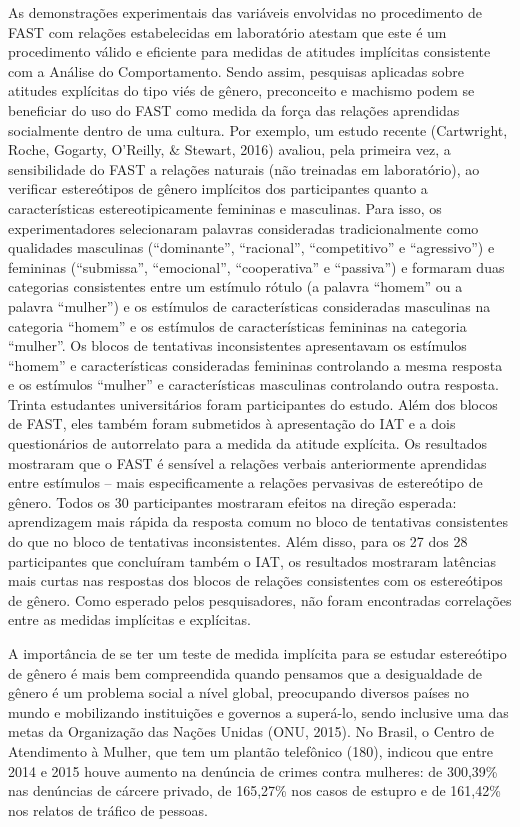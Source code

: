 As demonstrações experimentais das variáveis envolvidas no procedimento de FAST com relações estabelecidas em laboratório atestam que este é um procedimento válido e eficiente para medidas de atitudes implícitas consistente com a Análise do Comportamento. Sendo assim, pesquisas aplicadas sobre atitudes explícitas do tipo viés de gênero, preconceito e machismo podem se beneficiar do uso do FAST como medida da força das relações aprendidas socialmente dentro de uma cultura. Por exemplo, um estudo recente (Cartwright, Roche, Gogarty, O'Reilly, \& Stewart, 2016) avaliou, pela primeira vez, a sensibilidade do FAST a relações naturais (não treinadas em laboratório), ao verificar estereótipos de gênero implícitos dos participantes quanto a características estereotipicamente femininas e masculinas. Para isso, os experimentadores selecionaram palavras consideradas tradicionalmente como qualidades masculinas (``dominante'', ``racional'', ``competitivo'' e ``agressivo'') e femininas (``submissa'', ``emocional'', ``cooperativa'' e ``passiva'') e formaram duas categorias consistentes entre um estímulo rótulo (a palavra ``homem'' ou a palavra ``mulher'') e os estímulos de características consideradas masculinas na categoria ``homem'' e os estímulos de características femininas na categoria ``mulher''. Os blocos de tentativas inconsistentes apresentavam os estímulos ``homem'' e características consideradas femininas controlando a mesma resposta e os estímulos ``mulher'' e características masculinas controlando outra resposta. Trinta estudantes universitários foram participantes do estudo. Além dos blocos de FAST, eles também foram submetidos à apresentação do IAT e a dois questionários de autorrelato para a medida da atitude explícita. Os resultados mostraram que o FAST é sensível a relações verbais anteriormente aprendidas entre estímulos – mais especificamente a relações pervasivas de estereótipo de gênero. Todos os 30 participantes mostraram efeitos na direção esperada: aprendizagem mais rápida da resposta comum no bloco de tentativas consistentes do que no bloco de tentativas inconsistentes. Além disso, para os 27 dos 28 participantes que concluíram também o IAT, os resultados mostraram latências mais curtas nas respostas dos blocos de relações consistentes com os estereótipos de gênero. Como esperado pelos pesquisadores, não foram encontradas correlações entre as medidas implícitas e explícitas.

A importância de se ter um teste de medida implícita para se estudar estereótipo de gênero é mais bem compreendida quando pensamos que a desigualdade de gênero é um problema social a nível global, preocupando diversos países no mundo e mobilizando instituições e governos a superá-lo, sendo inclusive uma das metas da Organização das Nações Unidas (ONU, 2015). No Brasil, o Centro de Atendimento à Mulher, que tem um plantão telefônico (180), indicou que entre 2014 e 2015 houve aumento na denúncia de crimes contra mulheres: de 300,39\% nas denúncias de cárcere privado, de 165,27\% nos casos de estupro e de 161,42\% nos relatos de tráfico de pessoas.

